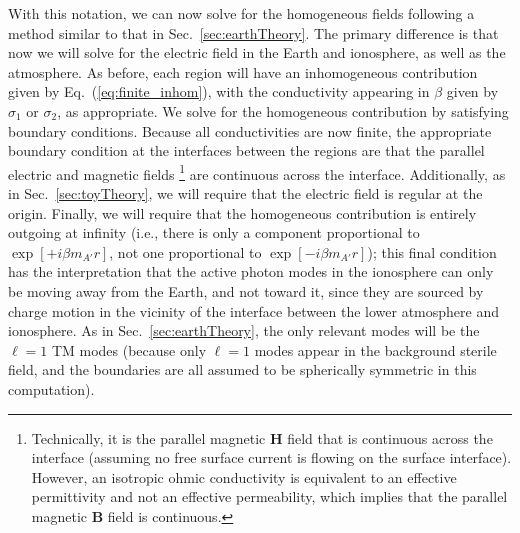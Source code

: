 \documentclass[amsmath,amssymb,aps,10pt,prd,letterpaper,nofootinbib,balancelastpage,notitlepage,superscriptaddress,twocolumn,floatfix]{revtex4-2}
\newcommand{\secref}[2][]{Sec{#1}.~\ref{#2}}		%
\renewcommand{\eqref}[2][]{Eq{#1}.~(\ref{eq:#2})}	%
\begin{document}
With this notation, we can now solve for the homogeneous fields following a method similar to that in \secref{sec:earthTheory}.
The primary difference is that now we will solve for the electric field in the Earth and ionosphere, as well as the atmosphere.
As before, each region will have an inhomogeneous contribution given by \eqref{finite_inhom}, with the conductivity appearing in $\beta$ given by $\sigma_1$ or $\sigma_2$, as appropriate.
We solve for the homogeneous contribution by satisfying boundary conditions.
Because all conductivities are now finite, the appropriate boundary condition at the interfaces between the regions are that the parallel electric and magnetic fields%
\footnote{\label{ftnt:BC1}%
    Technically, it is the parallel magnetic $\bm{H}$ field that is continuous across the interface (assuming no free surface current is flowing on the surface interface).
    However, an isotropic ohmic conductivity is equivalent to an effective permittivity and not an effective permeability, which implies that the parallel magnetic $\bm{B}$ field is continuous.
} %
are continuous across the interface.
Additionally, as in \secref{sec:toyTheory}, we will require that the electric field is regular at the origin.
Finally, we will require that the homogeneous contribution is entirely outgoing at infinity (i.e., there is only a component proportional to $\exp[+i\beta m_{A'}r]$, not one proportional to $\exp[-i\beta m_{A'}r]$); this final condition has the interpretation that the active photon modes in the ionosphere can only be moving away from the Earth, and not toward it, since they are sourced by charge motion in the vicinity of the interface between the lower atmosphere and ionosphere. 
As in \secref{sec:earthTheory}, the only relevant modes will be the $\ell=1$ TM modes (because only $\ell =1$ modes appear in the background sterile field, and the boundaries are all assumed to be spherically symmetric in this computation).
\end{document}
